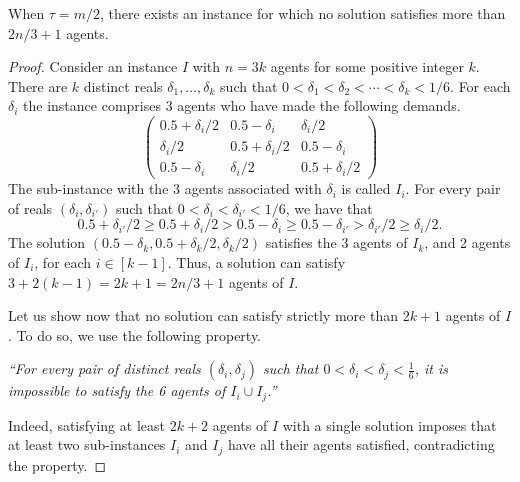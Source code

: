 \documentclass{article}
\begin{document}
\begin{theorem} \label{upper_bound} 
When $\tau=m/2$, there exists an instance for which no 
solution  
satisfies more than $2n/3+1$ agents.  
\end{theorem}
\begin{proof}
Consider an instance $I$ with $n=3k$ agents for some positive integer $k$. There are $k$ distinct reals $\delta_1, \ldots, \delta_k$ such that 
$0< \delta_1 < \delta_2 < \cdots < \delta_k <1/6$. 
For each $\delta_i$ the instance comprises 3 agents who have made the following demands.  
\begin{equation} \label{nocover0}
\left( \begin{array}{ccc}
0.5+\delta_i/2 & 0.5-\delta_i& \delta_i/2 \\
\delta_i/2 & 0.5+\delta_i/2  & 0.5-\delta_i \\
0.5-\delta_i & \delta_i/2 & 0.5+\delta_i/2  
\end{array} \right)
\end{equation}
The sub-instance with the 3 agents associated with $\delta_i$ is called $I_i$. For every pair of reals $(\delta_i,\delta_{i'})$ such that $0< \delta_i < \delta_{i'} <1/6$, we have that 
\begin{equation}
0.5+\delta_{i'}/2 \ge  0.5+\delta_{i}/2 > 0.5-\delta_i \ge   
0.5-\delta_{i'} > \delta_{i'}/2 \ge \delta_{i}/2.
\end{equation}
The solution $(0.5-\delta_k , 0.5+\delta_k/2 , \delta_k/2)$ satisfies the 3 agents of $I_k$, and 2 agents of $I_i$, for each $i\in [k-1]$. Thus, a solution can satisfy $3+2(k-1)=2k+1=2n/3+1$ agents of $I$.  

Let us show now that no solution can satisfy strictly more than $2k+1$ agents of $I$. To do so, we use the following property. 
\begin{center}{\em
``For every pair of distinct reals $(\delta_i,\delta_j)$ such that $0< \delta_i<\delta_j<\frac{1}{6}$, it is impossible to satisfy the 6 agents of $I_i \cup I_j$.''}
\end{center}
Indeed, satisfying at least $2k+2$ agents of $I$ with a single solution imposes that at least two sub-instances $I_i$ and $I_j$ have all their agents satisfied, contradicting the property. 


\end{proof}
\end{document}

